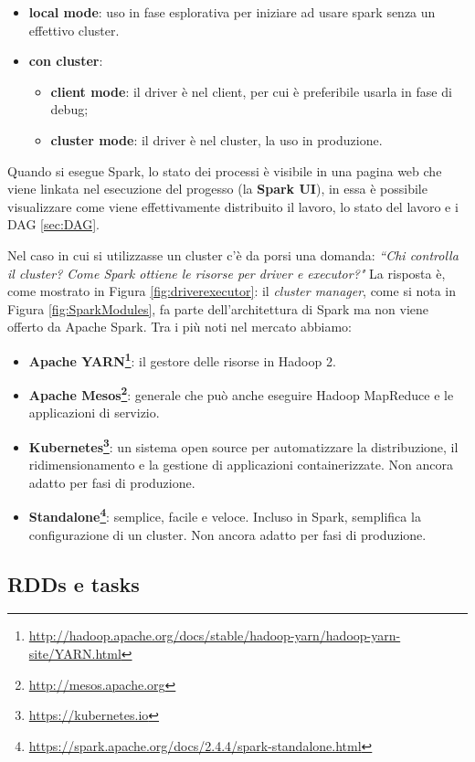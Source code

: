 \documentclass[12pt,italian]{article}
\begin{document}
\begin{itemize}
	\item \textbf{local mode}: uso in fase esplorativa per iniziare ad usare spark senza un effettivo cluster.
	\item \textbf{con cluster}:
	\begin{itemize}
		\item \textbf{client mode}: il driver è nel client, per cui è preferibile usarla in fase di debug;
		\item \textbf{cluster mode}: il driver è nel cluster, la uso in produzione.
	\end{itemize}
\end{itemize}
Quando si esegue Spark, lo stato dei processi è visibile in una pagina web che viene linkata nel esecuzione del progesso (la \textbf{Spark UI}), in essa è possibile visualizzare come viene effettivamente distribuito il lavoro, lo stato del lavoro e i DAG \ref{sec:DAG}. 

\par Nel caso in cui si utilizzasse un cluster c'è da porsi una domanda: \textit{``Chi controlla il cluster? Come Spark ottiene le risorse per driver e executor?"}
\newline La risposta è, come mostrato in Figura \ref{fig:driverexecutor}: il \textit{cluster manager}, come si nota in Figura \ref{fig:SparkModules}, fa parte dell'architettura di Spark ma non viene offerto da Apache Spark. Tra i più noti nel mercato abbiamo:
\begin{itemize}
	\item\textbf{Apache YARN\footnote{\url{http://hadoop.apache.org/docs/stable/hadoop-yarn/hadoop-yarn-site/YARN.html}}}: il gestore delle risorse in Hadoop 2.
	\item\textbf{Apache Mesos\footnote{\url{http://mesos.apache.org}}}: generale che può anche eseguire Hadoop MapReduce e le applicazioni di servizio.
	\item\textbf{Kubernetes\footnote{\url{https://kubernetes.io}}}: un sistema open source per automatizzare la distribuzione, il ridimensionamento e la gestione di applicazioni containerizzate. Non ancora adatto per fasi di produzione.
	\item\textbf{Standalone\footnote{\url{https://spark.apache.org/docs/2.4.4/spark-standalone.html}}}: semplice, facile e veloce. Incluso in Spark, semplifica la configurazione di un cluster. Non ancora adatto per fasi di produzione. 
\end{itemize}

\subsection{RDDs  e tasks}
\end{document}
